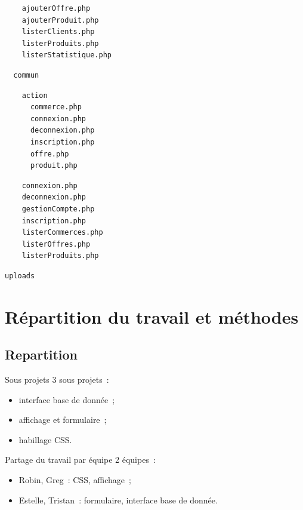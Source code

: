 \documentclass{beamer}
\begin{document}
\begin{frame}[fragile]
\begin{multicols}{3}
{\color{frenchblue}
		\begin{Verbatim}
    ajouterOffre.php
    ajouterProduit.php
    listerClients.php
    listerProduits.php
    listerStatistique.php
  		\end{Verbatim}
\color{blue}
		\begin{Verbatim}
  commun
    		\end{Verbatim}
\color{forestgreen}
		\begin{Verbatim}
    action
      commerce.php
      connexion.php
      deconnexion.php
      inscription.php
      offre.php
      produit.php
    		\end{Verbatim}
\color{frenchblue}
		\begin{Verbatim}
    connexion.php
    deconnexion.php
    gestionCompte.php
    inscription.php
    listerCommerces.php
    listerOffres.php
    listerProduits.php
		\end{Verbatim}
\color{blue}
		\begin{Verbatim}
uploads
		\end{Verbatim}
		}
	\end{multicols}
\end{frame}

\section{Répartition du travail et méthodes}

\subsection{Repartition}

\begin{frame}{Sous projets}
	3 sous projets~:
	\begin{itemize}
		\item interface base de donnée~;
		\item affichage et formulaire~;
		\item habillage CSS.
	\end{itemize}
\end{frame}

\begin{frame}{Partage du travail par équipe}
	2 équipes~:
	\begin{itemize}
		\item Robin, Greg~: CSS, affichage~;
		\item Estelle, Tristan~: formulaire, interface base de donnée.
	\end{itemize}

\end{frame}
\end{document}

